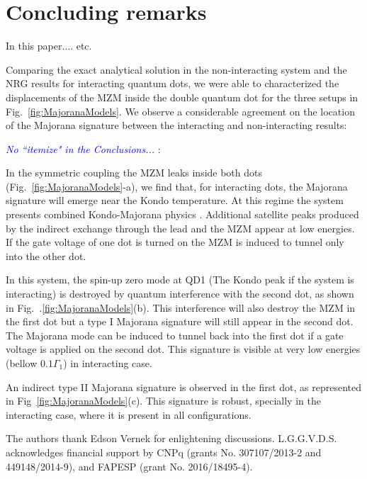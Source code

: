 \documentclass[showpacs,aps,prb,reprint,superscriptaddress]{revtex4-1}
\newcommand{\LUIS}[1]{\textcolor{blue}{\fbox{Luis} {\sl#1}}}
\begin{document}
\section{Concluding remarks}
\label{sec:Conclusions}

In this paper.... etc.

Comparing the exact analytical solution in the non-interacting system and the NRG results for interacting quantum dots, we were able to characterized the displacements of the MZM inside the double quantum dot for the three setups in Fig.\ \ref{fig:MajoranaModels}. We observe a considerable agreement on the location of the Majorana signature between the interacting and non-interacting results:

\LUIS{No ``itemize" in the Conclusions...}
    : 
    
    In the symmetric coupling the MZM leaks inside both dots (Fig.\ \ref{fig:MajoranaModels}-a), we find that,  for interacting dots, the Majorana signature will  emerge near the Kondo temperature. At this regime the system presents combined Kondo-Majorana physics . Additional satellite peaks produced by the indirect exchange through the lead and the MZM appear at low energies. If the gate voltage of one dot is turned on the MZM is induced to tunnel only into the other dot.  


In this system, the spin-up zero mode at QD1 (The Kondo peak if the system is interacting) is destroyed by quantum interference with the second dot, as shown in Fig.\ .\ref{fig:MajoranaModels}(b). This interference will also destroy the MZM in the first dot but a type I Majorana signature will still appear in the second dot. The Majorana mode can be induced to tunnel back into the first dot if a gate voltage is applied on the second dot. This signature is visible at very low energies (bellow $0.1\Gamma_1$) in interacting case. 

An indirect type II Majorana signature is observed in the first dot, as represented in Fig\ \ref{fig:MajoranaModels}(c). This signature is robust, specially in the interacting case, where it is present in all configurations. 

\begin{acknowledgments}
The authors thank Edson Vernek for enlightening discussions.  L.G.G.V.D.S. acknowledges financial support by CNPq (grants No. 307107/2013-2 and 449148/2014-9), and FAPESP (grant No. 2016/18495-4).
\end{acknowledgments}
\end{document}
